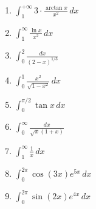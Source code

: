 \documentclass[11pt,a4paper]{article}
\begin{document}
\begin{enumerate}
\item $\displaystyle \int_{1}^{+\infty} 3 \cdot \frac{\arctan x}{x^{2}} \, dx$
\item $\displaystyle \int_{1}^{\infty} \frac{\ln x}{x^{2}} \, dx$
\item $\displaystyle \int_{0}^{2} \frac{dx}{(2 - x)^{1/3}}$
\item $\displaystyle \int_{0}^{1} \frac{x^{2}}{\sqrt{1 - x^{2}}} \, dx$
\item $\displaystyle \int_{0}^{\pi/2} \tan x \, dx$
\item $\displaystyle \int_{0}^{\infty} \frac{dx}{\sqrt{x}(1 + x)}$
\item $\displaystyle \int_{1}^{\infty} \frac{1}{x} \, dx$
\item $\displaystyle \int_{0}^{2\pi} \cos(3x) e^{5x} \, dx$
\item $\displaystyle \int_{0}^{2\pi} \sin(2x) e^{4x} \, dx$
\end{enumerate}
\end{document}
